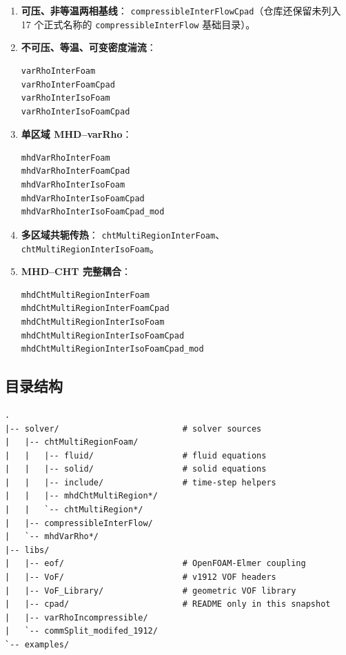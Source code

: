 \documentclass[11pt,a4paper]{article}
\begin{document}
\begin{enumerate}
    \item \textbf{可压、非等温两相基线}：
    \texttt{compressibleInterFlowCpad}（仓库还保留未列入 17 个正式名称的
    \texttt{compressibleInterFlow} 基础目录）。
    \item \textbf{不可压、等温、可变密度湍流}：
\begin{lstlisting}[style=cppstyle,numbers=none]
varRhoInterFoam
varRhoInterFoamCpad
varRhoInterIsoFoam
varRhoInterIsoFoamCpad
\end{lstlisting}
    \item \textbf{单区域 MHD--varRho}：
\begin{lstlisting}[style=cppstyle,numbers=none]
mhdVarRhoInterFoam
mhdVarRhoInterFoamCpad
mhdVarRhoInterIsoFoam
mhdVarRhoInterIsoFoamCpad
mhdVarRhoInterIsoFoamCpad_mod
\end{lstlisting}
    \item \textbf{多区域共轭传热}：
    \texttt{chtMultiRegionInterFoam}、\texttt{chtMultiRegionInterIsoFoam}。
    \item \textbf{MHD--CHT 完整耦合}：
\begin{lstlisting}[style=cppstyle,numbers=none]
mhdChtMultiRegionInterFoam
mhdChtMultiRegionInterFoamCpad
mhdChtMultiRegionInterIsoFoam
mhdChtMultiRegionInterIsoFoamCpad
mhdChtMultiRegionInterIsoFoamCpad_mod
\end{lstlisting}
\end{enumerate}

\subsection{目录结构}

\begin{lstlisting}[style=cppstyle, caption={项目顶层目录结构}]
.
|-- solver/                         # solver sources
|   |-- chtMultiRegionFoam/
|   |   |-- fluid/                  # fluid equations
|   |   |-- solid/                  # solid equations
|   |   |-- include/                # time-step helpers
|   |   |-- mhdChtMultiRegion*/
|   |   `-- chtMultiRegion*/
|   |-- compressibleInterFlow/
|   `-- mhdVarRho*/
|-- libs/
|   |-- eof/                        # OpenFOAM-Elmer coupling
|   |-- VoF/                        # v1912 VOF headers
|   |-- VoF_Library/                # geometric VOF library
|   |-- cpad/                       # README only in this snapshot
|   |-- varRhoIncompressible/
|   `-- commSplit_modifed_1912/
`-- examples/
\end{lstlisting}
\end{document}
